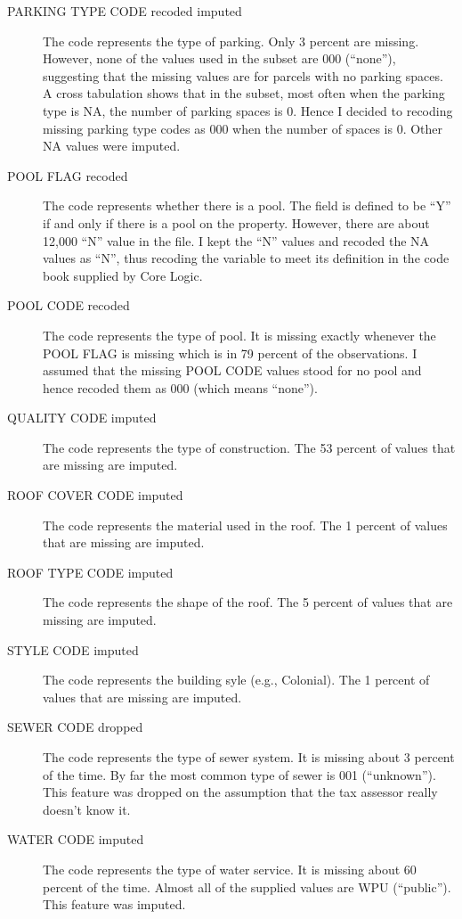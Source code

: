\begin{description}
\item[PARKING TYPE CODE recoded imputed] The code represents the type
  of parking. Only 3 percent are missing. However, none of the values
  used in the subset are 000 (``none''), suggesting that the missing
  values are for parcels with no parking spaces. A cross tabulation
  shows that in the subset, most often when the parking type is NA,
  the number of parking spaces is 0. Hence I decided to recoding
  missing parking type codes as 000 when the number of spaces is
  0. Other NA values were imputed.

\item[POOL FLAG recoded] The code represents whether there is a
  pool. The field is defined to be ``Y'' if and only if there is a
  pool on the property. However, there are about 12,000 ``N'' value in
  the file. I kept the ``N'' values and recoded the NA values as
  ``N'', thus recoding the variable to meet its definition in the code
  book supplied by Core Logic. 

\item[POOL CODE recoded] The code represents the type of pool. It is
  missing exactly whenever the POOL FLAG is missing which is in 79
  percent of the observations. I assumed that the missing POOL CODE
  values stood for no pool and hence recoded them as 000 (which means
  ``none''). 

\item[QUALITY CODE imputed] The code represents the type of construction. The
  53 percent of values that are missing are imputed.

\item[ROOF COVER CODE imputed] The code represents the material used in the
  roof. The 1 percent of values that are missing are imputed. 

\item[ROOF TYPE CODE imputed] The code represents the shape of the roof. The
  5 percent of values that are missing are imputed.

\item[STYLE CODE imputed] The code represents the building syle (e.g.,
  Colonial). The 1 percent of values that are missing are imputed.

\item[SEWER CODE dropped] The code represents the type of sewer
  system. It is missing about 3 percent of the time. By far
  the most common type of sewer is 001 (``unknown''). This feature was
  dropped on the assumption that the tax assessor really doesn't know it.

\item[WATER CODE imputed] The code represents the type of water
  service. It is missing about 60 percent of the time. Almost all of
  the supplied values are WPU (``public''). This feature was imputed.

\end{description}


